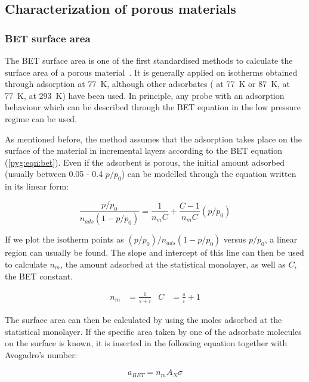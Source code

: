 \subsection{Characterization of porous materials}

\subsubsection{BET surface area}\label{pyg:charac:betarea}

The BET surface area is one of the first standardised methods 
to calculate the surface area of a porous 
material~\cite{brunauerAdsorptionGasesMultimolecular1938}. 
It is generally applied on isotherms obtained through  
adsorption at \SI{77}{\kelvin}, although other adsorbates 
( at \SI{77}{\kelvin} or \SI{87}{\kelvin}, 
 at \SI{77}{\kelvin},  at \SI{293}{\kelvin})
have been used. In principle, any probe with an adsorption behaviour 
which can be described through the BET equation in the low pressure regime
can be used.

As mentioned before, the method assumes that the adsorption takes place 
on the surface of the material in incremental layers according to the
BET equation (\ref{pyg:eqn:bet}). 
Even if the adsorbent is porous, the initial amount adsorbed 
(usually between 0.05 - 0.4 \(p/p_0\)) can be
modelled through the equation written in its linear form:

\begin{equation}
    \frac{p/p_0}{n_{ads} (1-p/p_0)} = \frac{1}{n_{m} C} + \frac{C - 1}{n_{m} C}(p/p_0)
\end{equation}

If we plot the isotherm points as
\({(p/p_0)}/{n_{ads}(1-p/p_0)}\) versus \(p/p_0\), a linear region
can usually be found. The slope and intercept of this line
can then be used to calculate \(n_{m}\), the amount adsorbed at the
statistical monolayer, as well as \(C\), the BET constant.

\begin{align}
    n_{m} &= \frac{1}{s+i} & C &= \frac{s}{i} + 1
\end{align}

The surface area can then be calculated by using the moles
adsorbed at the statistical monolayer. If the specific area taken
by one of the adsorbate molecules on the surface is known, it is
inserted in the following equation together with Avogadro's number:

\begin{equation}
    a_{BET} = n_m A_N \sigma
\end{equation}

